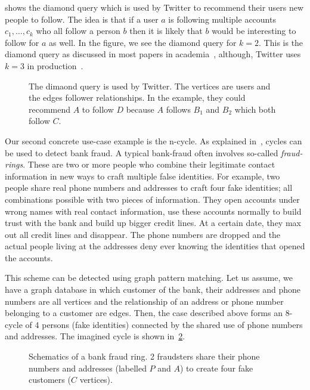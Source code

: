  shows the diamond query which is used by Twitter to recommend their users new people to follow.
The idea is that if a user $a$ is following multiple accounts $c_1, \dots, c_k$ who all follow a person $b$ then it is likely that
$b$ would be interesting to follow for $a$ as well.
In the figure, we see the diamond query for $k = 2$.
This is the diamond query as discussed in most papers in academia~\cite{olddog,myria-detailed,mhedhbi2019}, although,
Twitter uses $k = 3$ in production~\cite{twitter-diamond}.

\begin{figure}
    \centering
    
    \caption{The dimaond query is used by Twitter. The vertices are users and the edges follower relationships.
    In the example, they could recommend $A$ to follow $D$ because $A$ follows $B_1$ and $B_2$ which both follow $C$.
    }
    \label{fig:pattern-diamond}
\end{figure}

Our second concrete use-case example is the n-cycle.
As explained in~\cite{fraud-detection}, cycles can be used to detect bank fraud.
A typical bank-fraud often involves so-called \textit{fraud-rings}.
These are two or more people who combine their legitimate contact information in new ways to craft multiple false identities.
For example, two people share real phone numbers and addresses to craft four fake identities; all combinations possible with two pieces
of information.
They open accounts under wrong names with real contact information, use these accounts normally to build trust with the bank and
build up bigger credit lines.
At a certain date, they max out all credit lines and disappear.
The phone numbers are dropped and the actual people living at the addresses deny ever knowing the identities that opened the accounts.

This scheme can be detected using graph pattern matching.
Let us assume, we have a graph database in which customer of the bank, their addresses and phone numbers are all vertices and the
relationship of an address or phone number belonging to a customer are edges.
Then, the case described above forms an 8-cycle of 4 persons (fake identities) connected by the shared use of phone numbers and
addresses.
The imagined cycle is shown in~\cref{fig:graph-pattern-example-bank-fraud}.

\begin{figure}
    \centering
    
    \caption{Schematics of a bank fraud ring.
    2 fraudsters share their phone numbers and addresses (labelled $P$ and $A$) to create four
    fake customers ($C$ vertices).
    }
    \label{fig:graph-pattern-example-bank-fraud}
\end{figure}


